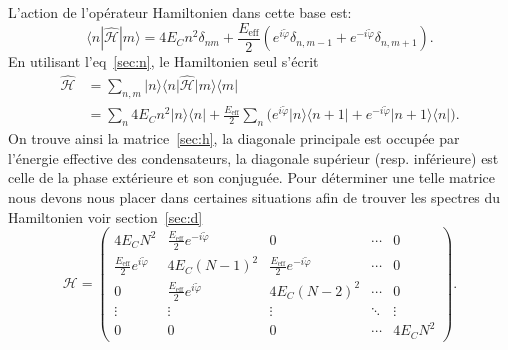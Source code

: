L'action de l'opérateur Hamiltonien  dans cette base est:
\begin{equation}
\langle n|\mathcal{\hat{H}}|m\rangle
=4E_C n^2\delta_{nm}
+\frac{E_{\mathrm{eff}}}{2}
\left(
e^{i\tilde{\varphi}}\delta_{n,m-1}
+e^{-i\tilde{\varphi}}\delta_{n,m+1}
\right).
\end{equation}
En utilisant l'eq~\ref{sec:n}, le Hamiltonien seul s'écrit 
\begin{align}
\mathcal{\hat{H}} &=\sum_{n,m}|n\rangle\langle n|\mathcal{\hat{H}}|m\rangle\langle m|\\
&= \sum_n 4E_C n^2 |n\rangle\langle n|
+\frac{E_{\mathrm{eff}}}{2}
\sum_n \Big(
e^{i\tilde{\varphi}} |n\rangle\langle n+1|
+ e^{-i\tilde{\varphi}} |n+1\rangle\langle n|
\Big).
\end{align}
On trouve ainsi la matrice~\ref{sec:h}, la diagonale principale est occupée par l'énergie effective des condensateurs, la diagonale supérieur (resp. inférieure) est celle de la phase extérieure et son conjuguée. Pour déterminer une telle matrice nous devons nous placer dans certaines  situations afin de trouver les spectres du Hamiltonien voir section~\ref{sec:d}
\begin{equation}
\mathcal{H} =
\begin{pmatrix}
4E_C N^2 & \frac{E_{\mathrm{eff}}}{2}e^{-i\tilde{\varphi}} & 0 & \cdots & 0 \\
\frac{E_{\mathrm{eff}}}{2}e^{i\tilde{\varphi}} & 4E_C (N-1)^2 & \frac{E_{\mathrm{eff}}}{2}e^{-i\tilde{\varphi}} & \cdots & 0 \\
0 & \frac{E_{\mathrm{eff}}}{2}e^{i\tilde{\varphi}} & 4E_C (N-2)^2 & \cdots & 0 \\
\vdots & \vdots & \vdots & \ddots & \vdots \\
0 & 0 & 0 & \cdots & 4E_C N^2
\end{pmatrix}.
\label{sec:h}
\end{equation}

